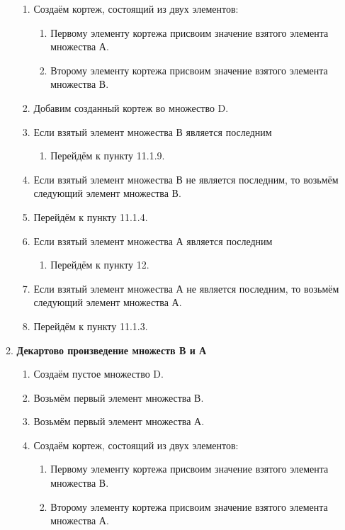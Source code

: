 \documentclass[a4paper,12pt]{extarticle}
\begin{document}
\begin{enumerate}
\begin{enumerate}[label*=\arabic*.]
\begin{enumerate}[label*=\arabic*.]
      \item Создаём кортеж, состоящий из двух элементов:
      \begin{enumerate}[label*=\arabic*.]
        \item Первому элементу кортежа присвоим значение взятого элемента множества А.
        \item Второму элементу кортежа присвоим значение взятого элемента множества В.
      \end{enumerate}
      \item Добавим созданный кортеж во множество D.
      \item Если взятый элемент множества В является последним
      \begin{enumerate}[label*=\arabic*.]
        \item Перейдём к пункту 11.1.9.
      \end{enumerate}
      \item Если взятый элемент множества В не является последним, то возьмём следующий элемент множества В.
      \item Перейдём к пункту 11.1.4.
      \item Если взятый элемент множества А является последним
      \begin{enumerate}[label*=\arabic*.]
        \item Перейдём к пункту 12.
      \end{enumerate}
      \item Если взятый элемент множества А не является последним, то возьмём следующий элемент множества А.
      \item Перейдём к пункту 11.1.3.
    \end{enumerate}
    \item \textbf{Декартово произведение множеств В и А}
    \begin{enumerate}[label*=\arabic*.]
      \item Создаём пустое множество D.
      \item Возьмём первый элемент множества В.
      \item Возьмём первый элемент множества А.
      \item Создаём кортеж, состоящий из двух элементов:
      \begin{enumerate}[label*=\arabic*.]
        \item Первому элементу кортежа присвоим значение взятого элемента множества В.
        \item Второму элементу кортежа присвоим значение взятого элемента множества А.

\end{enumerate}
\end{enumerate}
\end{enumerate}
\end{enumerate}
\end{document}

